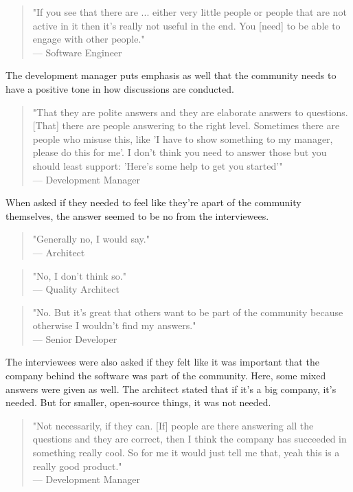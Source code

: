 \documentclass{cslthse-msc}
\begin{document}
    \begin{quote}
        "If you see that there are ... either very little people or people that are not active in it then it's really not useful in the end. You [need] to be able to engage with other people."\\--- Software Engineer
    \end{quote}
    The development manager puts emphasis as well that the community needs to have a positive tone in how discussions are conducted.
    \begin{quote}
        "That they are polite answers and they are elaborate answers to questions. [That] there are people answering to the right level. Sometimes there are people who misuse this, like 'I have to show something to my manager, please do this for me'. I don't think you need to answer those but you should least support: 'Here's some help to get you started'"\\--- Development Manager
    \end{quote}
    When asked if they needed to feel like they're apart of the community themselves, the answer seemed to be no from the interviewees.
    \begin{quote}
        "Generally no, I would say."\\ --- Architect
    \end{quote}
    \begin{quote}
        "No, I don't think so."\\--- Quality Architect
    \end{quote}
    \begin{quote}
        "No. But it's great that others want to be part of the community because otherwise I wouldn't find my answers."\\--- Senior Developer
    \end{quote}
    The interviewees were also asked if they felt like it was important that the company behind the software was part of the community. Here, some mixed answers were given as well. The architect stated that if it's a big company, it's needed. But for smaller, open-source things, it was not needed.
    \begin{quote}
        "Not necessarily, if they can. [If] people are there answering all the questions and they are correct, then I think the company has succeeded in something really cool. So for me it would just tell me that, yeah this is a really good product."\\--- Development Manager
    \end{quote}
\end{document}
